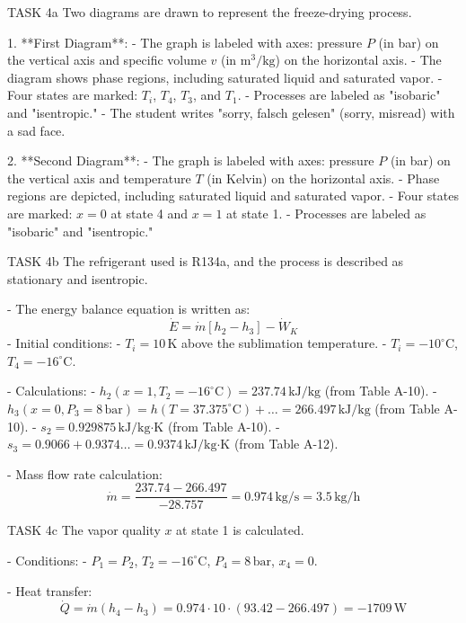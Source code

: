 TASK 4a  
Two diagrams are drawn to represent the freeze-drying process.  

1. **First Diagram**:  
   - The graph is labeled with axes: pressure \( P \) (in bar) on the vertical axis and specific volume \( v \) (in \( \text{m}^3/\text{kg} \)) on the horizontal axis.  
   - The diagram shows phase regions, including saturated liquid and saturated vapor.  
   - Four states are marked: \( T_i \), \( T_4 \), \( T_3 \), and \( T_1 \).  
   - Processes are labeled as "isobaric" and "isentropic."  
   - The student writes "sorry, falsch gelesen" (sorry, misread) with a sad face.  

2. **Second Diagram**:  
   - The graph is labeled with axes: pressure \( P \) (in bar) on the vertical axis and temperature \( T \) (in Kelvin) on the horizontal axis.  
   - Phase regions are depicted, including saturated liquid and saturated vapor.  
   - Four states are marked: \( x = 0 \) at state 4 and \( x = 1 \) at state 1.  
   - Processes are labeled as "isobaric" and "isentropic."  

TASK 4b  
The refrigerant used is R134a, and the process is described as stationary and isentropic.  

- The energy balance equation is written as:  
  \[
  \dot{E} = \dot{m} \left[ h_2 - h_3 \right] - \dot{W}_K
  \]  
- Initial conditions:  
  - \( T_i = 10 \, \text{K} \) above the sublimation temperature.  
  - \( T_i = -10^\circ\text{C} \), \( T_4 = -16^\circ\text{C} \).  

- Calculations:  
  - \( h_2 (x=1, T_2=-16^\circ\text{C}) = 237.74 \, \text{kJ/kg} \) (from Table A-10).  
  - \( h_3 (x=0, P_3=8 \, \text{bar}) = h(T=37.375^\circ\text{C}) + \dots = 266.497 \, \text{kJ/kg} \) (from Table A-10).  
  - \( s_2 = 0.929875 \, \text{kJ/kg·K} \) (from Table A-10).  
  - \( s_3 = 0.9066 + 0.9374 \dots = 0.9374 \, \text{kJ/kg·K} \) (from Table A-12).  

- Mass flow rate calculation:  
  \[
  \dot{m} = \frac{237.74 - 266.497}{-28.757} = 0.974 \, \text{kg/s} = 3.5 \, \text{kg/h}
  \]  

TASK 4c  
The vapor quality \( x \) at state 1 is calculated.  

- Conditions:  
  - \( P_1 = P_2 \), \( T_2 = -16^\circ\text{C} \), \( P_4 = 8 \, \text{bar} \), \( x_4 = 0 \).  

- Heat transfer:  
  \[
  \dot{Q} = \dot{m} \left( h_4 - h_3 \right) = 0.974 \cdot 10 \cdot \left( 93.42 - 266.497 \right) = -1709 \, \text{W}
  \]  


